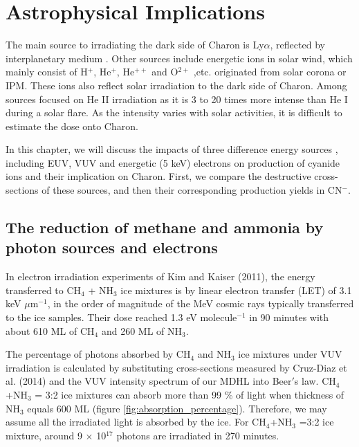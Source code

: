 \chapter{\protect Astrophysical Implications}
\label{astron}

The main source to irradiating the dark side of Charon is Ly$\alpha$, reflected by interplanetary medium \cite{grundy2016formation}. Other sources include energetic ions in solar wind, which mainly consist of H$^+$, He$^+$, He$^{++}$ and O$^{2+}$ ,etc. originated from solar corona or IPM. These ions also reflect solar irradiation to the dark side of Charon. Among sources focused on He II irradiation as it is 3 to 20 times more intense than He I during a solar flare. As the intensity varies with solar activities, it is difficult to estimate the dose onto Charon. 

In this chapter, we will discuss the impacts of three difference energy sources , including EUV, VUV and energetic (5 keV) electrons on production of cyanide ions and their implication on Charon. First, we compare the destructive cross-sections of these sources, and then their corresponding production yields in CN$^-$. 
\section{The reduction of methane and ammonia by photon sources and electrons}

In electron irradiation experiments of Kim and Kaiser (2011)\cite{kim}, the energy transferred to CH$_4$ + NH$_3$ ice mixtures is by linear electron transfer (LET) of 3.1 keV $\mu$m$^{-1}$, in the order of magnitude of the MeV cosmic rays typically transferred to the ice samples. Their dose reached 1.3 eV molecule$^{-1}$ in 90 minutes with about 610 ML of CH$_4$ and 260 ML of NH$_3$. 

The percentage of photons absorbed by CH$_4$ and NH$_3$ ice mixtures under VUV irradiation is calculated by substituting cross-sections measured by Cruz-Diaz et al. (2014) \cite{cruz2014vacuum} and the VUV intensity spectrum of our MDHL into Beer$'$s law. CH$_4$+NH$_3$ = 3:2 ice mixtures can absorb more than 99 \% of light when thickness of NH$_3$ equals 600 ML (figure \ref{fig:absorption_percentage}). Therefore, we may assume all the irradiated light is absorbed by the ice. For CH$_4$+NH$_3$ =3:2 ice mixture, around 9 $\times$ 10$^{17}$ photons are irradiated in 270 minutes.

